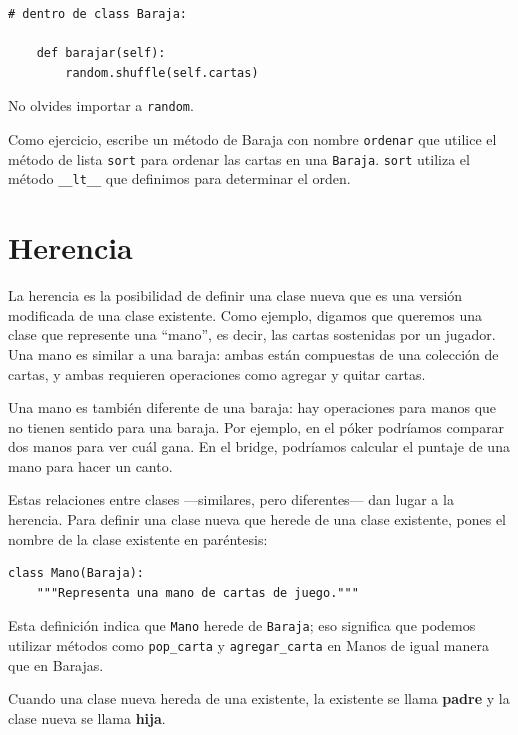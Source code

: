\documentclass[10pt]{book}
\begin{document}
\begin{verbatim}
# dentro de class Baraja:

    def barajar(self):
        random.shuffle(self.cartas)
\end{verbatim}
%
No olvides importar a {\tt random}.

Como ejercicio, escribe un método de Baraja con nombre {\tt ordenar} que utilice el
método de lista {\tt sort} para ordenar las cartas en una {\tt Baraja}.  {\tt sort}
utiliza el método \verb"__lt__" que definimos para determinar el orden.
 



\section{Herencia}

La herencia es la posibilidad de definir una clase nueva que es una versión
modificada de una clase existente.  Como ejemplo, digamos que queremos una
clase que represente una ``mano'', es decir, las cartas sostenidas por un jugador.
Una mano es similar a una baraja: ambas están compuestas de una colección de
cartas, y ambas requieren operaciones como agregar y quitar cartas.

Una mano es también diferente de una baraja: hay operaciones para
manos que no tienen sentido para una baraja.  Por ejemplo, en el póker
podríamos comparar dos manos para ver cuál gana.  En el bridge, podríamos
calcular el puntaje de una mano para hacer un canto.

Estas relaciones entre clases ---similares, pero diferentes--- dan lugar
a la herencia.
Para definir una clase nueva que herede de una clase existente,
pones el nombre de la clase existente en paréntesis:

\begin{verbatim}
class Mano(Baraja):
    """Representa una mano de cartas de juego."""
\end{verbatim}
%
Esta definición indica que {\tt Mano} herede de {\tt Baraja};
eso significa que podemos utilizar métodos como \verb"pop_carta" y \verb"agregar_carta"
en Manos de igual manera que en Barajas.

Cuando una clase nueva hereda de una existente, la existente
se llama {\bf padre} y la clase nueva se
llama {\bf hija}.
\end{document}
